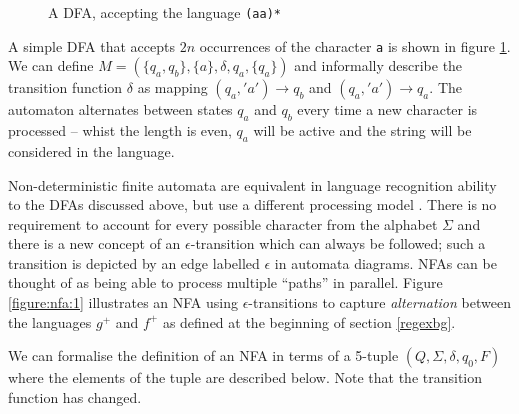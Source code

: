 \documentclass[a4paper,openany,12pt]{book}
\begin{document}
\begin{figure}[H]
    \begin{MyMdframed}
        \vspace{0.5em}
        \caption{\label{figure:dfa:1} A DFA, accepting the language \texttt{(aa)*}}
        \vspace{0.5em}
        \captionsetup{style=default}


        \vspace{0.5em}
    \end{MyMdframed}
\end{figure}

A simple DFA that accepts $2n$ occurrences of the character \texttt{a} is shown in figure \ref{figure:dfa:1}.
We can define $M = (\{q_a,q_b\}, \{a\}, \delta, q_a, \{q_a\})$ and informally describe the transition function $\delta$
as mapping $(q_a, 'a') \rightarrow q_b$ and $(q_a, 'a') \rightarrow q_a$.
The automaton alternates between states $q_a$ and $q_b$ every time a new character is processed -- whist the length is
even, $q_a$ will be active and the string will be considered in the language.

Non-deterministic finite automata are equivalent in language recognition ability to the DFAs discussed above, but use a
different processing model \citep[p.~46]{sipser2012introduction}.
There is no requirement to account for every possible character from the alphabet $\Sigma$ and there is a new concept of
an $\epsilon$-transition which can always be followed; such a transition is depicted by an edge labelled $\epsilon$ in
automata diagrams.
NFAs can be thought of as being able to process multiple ``paths'' in parallel.
Figure \ref{figure:nfa:1} illustrates an NFA using $\epsilon$-transitions to capture \emph{alternation} between the
languages $g^+$ and $f^+$ as defined at the beginning of section \ref{regexbg}.

We can formalise the definition of an NFA in terms of a 5-tuple $(Q, \Sigma, \delta, q_0, F)$ where the elements of the
tuple are described below.
Note that the transition function has changed.
\end{document}
